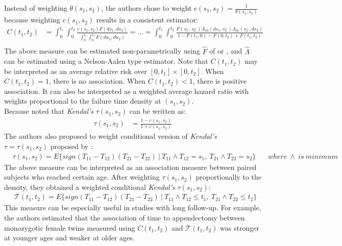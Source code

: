 \documentclass[]{article}
\begin{document}
Instead of weighting $\theta(s_1, s_2)$, the authors chose to weight $c(s_1, s_2) = \frac{1}{\theta(s_1, s_2)}$ because weighting $c(s_1, s_2)$ results in a consistent estimator:
	$$
	\begin{aligned}
		C(t_1, t_2) &= \int_0^{t_1}\int_0^{t_2} \frac{c(s_1, s_2)F(ds_1,ds_2)}{\int_0^{t_1}\int_0^{t_2} F(du_1, du_2)} = ...= \int_0^{t_1}\int_0^{t_2} \frac{F(s_1^-, s_2^-)\Lambda_{10}(ds_1, s^-_2)\Lambda_{01}(s^-_1, ds_2)}{1 - F(t_1, 0) - F(0, t_2)+ F(t_1, t_2)} \\
	\end{aligned}
	$$
	The above measure can be estimated non-parametrically using $\hat{F}$ of \cite{dabrowska1988kaplan} or \cite{prentice1992covariance}, and $\hat{\Lambda}$ can be estimated using a Nelson-Aalen type estimator.
Note that $C(t_1, t_2)$ may be interpreted as an average relative risk over $[0,t_1] \times [0, t_2]$. When $C(t_1, t_2)=1$, there is no association. When $C(t_1, t_2)<1$, there is positive association. It can also be interpreted as a weighted average hazard ratio with weights proportional to the failure time density at $(s_1,s_2)$.\\
Because \cite{oakes1989bivariate} noted that \emph{Kendal's} $\tau(s_1, s_2)$ can be written as:
	$$
	\begin{aligned}
		\tau(s_1, s_2) &= \frac{1 - c(s_1, s_2)}{1+c(s_1, s_2)}
	\end{aligned}
	$$
	The authors also proposed to weight conditional version of \emph{Kendal's} $\tau=\tau(s_1, s_2)$ proposed by \cite{oakes1989bivariate}:
	$$
	\begin{aligned}
		&\tau(s_1, s_2) = E\{sign(T_{11} - T_{12}) (T_{21} - T_{22})~|~ T_{11}\wedge T_{12} = s_1,~T_{21}\wedge T_{22} = s_2  \}
		&~~~~where~\wedge~is~minimum
	\end{aligned}
	$$
The above measure can be interpreted as an association measure between paired subjects who reached certain age. After weighting $\tau(s_1, s_2)$ proportionally to the density, they obtained a weighted conditional \emph{Kendal's} $\tau(s_1, s_2)$:
	$$
	\begin{aligned}
		&\mathcal{T}(t_1, t_2) = E\{sign(T_{11} - T_{12}) (T_{21} - T_{22})~|~ T_{11}\wedge T_{12} \leq t_1,~T_{21}\wedge T_{22} \leq t_2  \}
	\end{aligned}
	$$
This measure can be especially useful in studies with long follow-up. For example, the authors estimated that the association of time to appendectomy between monozygotic female twins measured using $C(t_1, t_2)$ and $\mathcal{T}(t_1, t_2)$ was stronger at younger ages and weaker at older ages.\\
~\\
\end{document}
